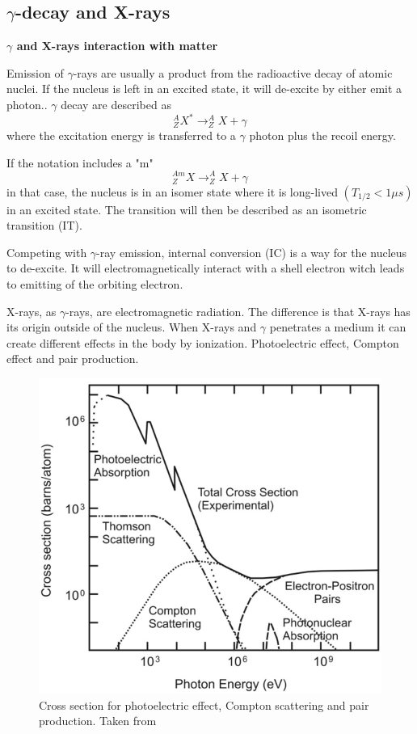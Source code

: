 \documentclass[twoside,english]{uiofysmaster/uiofysmaster}
\begin{document}
\subsection{$\gamma$-decay and X-rays}

\textbf{$\gamma$ and X-rays interaction with matter}

\noindent
Emission of $\gamma$-rays are usually a product from the radioactive decay of atomic nuclei. If the nucleus is left in an excited state, it will de-excite by either emit a photon.\cite{nuclearchem}. $\gamma$ decay are described as \begin{equation}
^{A}_{Z}X^* \rightarrow ^{A}_ZX + \gamma 
\end{equation}
where the excitation energy is transferred to a $\gamma$ photon plus the recoil energy.

If the notation includes a "m" \begin{equation}
^{Am}_ZX \rightarrow ^{A}_ZX + \gamma
\end{equation}
in that case, the nucleus is in an isomer state where it is long-lived $(T_{1/2} < 1 \mu s)$ in an excited state\cite{nuclearchem}. The transition will then be described as an isometric transition (IT).

Competing with $\gamma$-ray emission, internal conversion (IC) is a way for the nucleus to de-excite. It will electromagnetically interact with a shell electron witch leads to emitting of the orbiting electron\cite{toxicology}.

  
X-rays, as $\gamma$-rays, are electromagnetic radiation. The difference is that X-rays has its origin outside of the nucleus. When X-rays and $\gamma$ penetrates a medium it can create different effects in the body by ionization.
Photoelectric effect, Compton effect and pair production. 

\begin{figure}[h!]
    \centering
     \includegraphics[scale=0.4]{pcp_cross.png}
     \caption{Cross section for photoelectric effect, Compton scattering and pair production. Taken from \cite{photoelectric_cross} }
    \label{fig:photo-compton-pair}
\end{figure}
\end{document}
